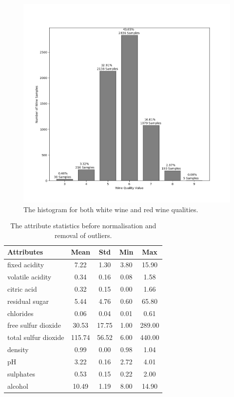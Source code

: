 \documentclass[10pt,twocolumn,letterpaper]{article}
\begin{document}
\begin{figure}[h]
	\begin{center}
		\includegraphics[width=0.9\linewidth]{samples.png}
	\end{center}
	\caption{The histogram for both white wine and red wine qualities.}
	\label{fig:long}
	\label{fig:onecol}
\end{figure}


\begin{table}[h]
	\begin{center}
		\begin{tabular}{|l|c|c|c|c|}
			\hline
			Attributes & Mean & Std & Min & Max \\
			\hline
			fixed acidity & 7.22 & 1.30 & 3.80 & 15.90 \\
			volatile acidity & 0.34 & 0.16 & 0.08 & 1.58 \\
			citric acid & 0.32 & 0.15 & 0.00 & 1.66 \\
			residual sugar & 5.44 & 4.76 & 0.60 & 65.80 \\
			chlorides & 0.06 & 0.04 & 0.01 & 0.61 \\
			free sulfur dioxide & 30.53 & 17.75 & 1.00 & 289.00 \\
			total sulfur dioxide & 115.74 & 56.52 & 6.00 & 440.00 \\
			density & 0.99 & 0.00 & 0.98 & 1.04 \\
			pH & 3.22 & 0.16 & 2.72 & 4.01 \\
			sulphates & 0.53 & 0.15 & 0.22 & 2.00 \\
			alcohol & 10.49 & 1.19 & 8.00 & 14.90 \\ 
			\hline
		\end{tabular}
	\end{center}
	\caption{The attribute statistics before normalisation and removal of outliers.}
\end{table}
\end{document}
